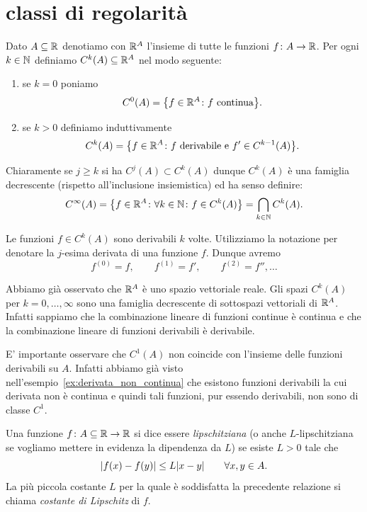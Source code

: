 \section{classi di regolarità}
\begin{definition}
\mymark{**}
Dato $A\subseteq \mathbb R$ denotiamo con $\mathbb R^A$ l'insieme di tutte le funzioni $f\colon A \to \mathbb R$.
Per ogni $k\in \mathbb N$ definiamo
$C^k(A) \subseteq \mathbb R^A$ nel modo seguente:
\begin{enumerate}
\item se $k=0$ poniamo
\[
  C^0(A) = {\left\{ f\in \mathbb R^A \colon \text{$f$ continua} \right\}}.
\]
\item
  se $k>0$ definiamo induttivamente
  \[
  C^{k}(A) = {\left\{ f\in \mathbb R^A \colon \text{$f$ derivabile e $f'\in C^{k-1}(A)$} \right\}}.
  \]
\end{enumerate}
Chiaramente se $j\ge k$ si ha $C^j(A) \subset C^k(A)$ dunque $C^k(A)$ è una famiglia decrescente (rispetto all'inclusione insiemistica) ed ha senso definire:
\[
  C^\infty(A) = {\left\{ f\in \mathbb R^A\colon \forall k \in \mathbb N\colon f\in C^k(A) \right\}} = \bigcap_{k\in \mathbb N} C^k(A).
\]

Le funzioni $f\in C^k(A)$ sono derivabili $k$ volte.
Utilizziamo la notazione  per denotare la $j$-esima derivata
di una funzione $f$.
Dunque avremo
\[
  f^{(0)} = f, \qquad
  f^{(1)} = f', \qquad
  f^{(2)} = f'', \dots
\]
\end{definition}

Abbiamo già osservato che $\mathbb R^A$ è uno spazio vettoriale reale.
Gli spazi $C^k(A)$ per $k=0, \dots, \infty$ sono una famiglia decrescente di sottospazi vettoriali di $\mathbb R^A$.
Infatti sappiamo che la combinazione lineare di funzioni continue è continua e che la combinazione lineare di funzioni derivabili è derivabile.

E' importante osservare che $C^1(A)$ non coincide con l'insieme delle funzioni derivabili su $A$. Infatti abbiamo già visto nell'esempio~\ref{ex:derivata_non_continua} che esistono funzioni derivabili la cui derivata non è continua e quindi tali funzioni, pur essendo derivabili, non sono di classe $C^1$.

\begin{definition}
\mymark{**}
Una funzione $f\colon A\subseteq \mathbb R \to \mathbb R$ si dice essere \emph{lipschitziana} (o anche $L$-lipschitziana se vogliamo mettere in evidenza la dipendenza da $L$) se esiste $L>0$ tale che
\[
  {\left|f(x) - f(y)\right|} \le L {\left|x-y\right|}\qquad \forall x,y\in A.
\]
La più piccola costante $L$ per la quale è soddisfatta la precedente relazione si chiama \emph{costante di Lipschitz}
di $f$.
\end{definition}


